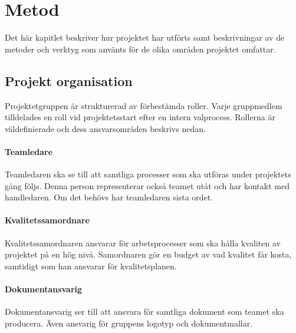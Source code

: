 
\chapter{Metod}
\label{cha:method}
Det här kapitlet beskriver hur projektet har utförts samt beskrivningar av de metoder och verktyg som använts för de olika områden projektet omfattar.

\section{Projekt organisation}
Projektetgruppen är strukturerad av förbestämda roller. Varje gruppmedlem tilldelades en roll vid projektetsstart efter en intern valprocess. Rollerna är väldefinierade och dess ansvarsområden beskrivs nedan.

\subsubsection*{Teamledare}
Teamledaren ska se till att samtliga processer som ska utföras under projektets gång följs. Denna person representerar också teamet utåt och har kontakt med handledaren. Om det behövs har teamledaren sista ordet.

\subsubsection*{Kvalitetssamordnare}
Kvalitetssamordnaren ansvarar för arbetsprocesser som ska hålla kvaliten av projektet på en hög nivå. Samordnaren gör en budget av vad kvalitet får kosta, samtidigt som han ansvarar för kvalitetsplanen.

\subsubsection*{Dokumentansvarig}
Dokumentansvarig ser till att ansvara för samtliga dokument som teamet ska producera. Även ansvarig för gruppens logotyp och dokumentmallar.

